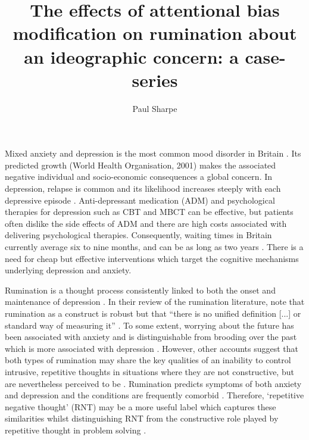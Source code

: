 \documentclass[man,a4paper,biblatex]{apa6}
\title{The effects of attentional bias modification on rumination about an ideographic concern: a case-series}
\author{Paul Sharpe}
\affiliation{University of Exeter}
\begin{document}
\maketitle
{}
\tableofcontents
\clearpage\setcounter{page}{1}

Mixed anxiety and depression is the most common mood disorder in Britain
\parencite{haliwell_fundamental_2007}.  Its predicted growth (World
Health Organisation, 2001) makes the associated negative individual and
socio-economic consequences a global concern.  In depression, relapse
is common and its likelihood increases steeply with each depressive
episode \parencite{haliwell_fundamental_2007}.  Anti-depressant
medication (ADM) and psychological therapies for depression such as
CBT and MBCT can be effective, but patients often dislike the side
effects of ADM and there are high costs associated with delivering
psychological therapies.  Consequently, waiting times in Britain
currently average six to nine months, and can be as long as two years
\parencite{haliwell_fundamental_2007}.  There is a need for cheap but
effective interventions which target the cognitive mechanisms underlying
depression and anxiety.

Rumination is a thought process consistently linked to both the onset and
maintenance of depression \parencite{watkins_habit-goal_2014}.  In their
review of the rumination literature, \textcite{smith_roadmap_2009}
note that rumination as a construct is robust but that ``there
is no unified definition [...] or standard way of measuring
it'' \textcite[][p. 117]{smith_roadmap_2009}.  To some extent,
worrying about the future has been associated with anxiety and is
distinguishable from brooding over the past which is more associated
with depression \parencite{papageorgiou_depressive_2004}.  However,
other accounts \parencite{watkins_comparisons_2005} suggest
that both types of rumination may share the key qualities of an
inability to control intrusive, repetitive thoughts in situations
where they are not constructive, but are nevertheless perceived to be
\parencite{watkins_constructive_2008}.  Rumination predicts symptoms of
both anxiety and depression \parencite{nolen-hoeksema_role_2000} and the
conditions are frequently comorbid \parencite{krusche_mindfulness_2013}.
Therefore, `repetitive negative thought' (RNT) may be a more useful
label which captures these similarities whilst distinguishing RNT from
the constructive role played by repetitive thought in problem solving
\parencite{watkins_constructive_2008}.
\end{document}
